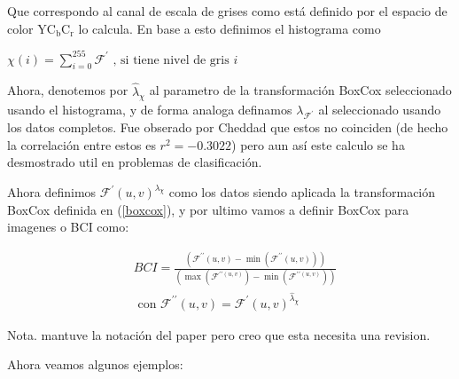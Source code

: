     Que correspondo al canal de escala de grises como est\'a definido por el espacio de color $\mathrm{YC}_{\mathrm{b}} \mathrm{C}_{\mathrm{r}}$ lo calcula. En base a esto definimos el histograma como
    
    $\chi(i)=\sum_{i=0}^{255}\mathcal{F}^{\prime} \text{ , si tiene nivel de gris } i$ 
    
    Ahora, denotemos por $\hat{\lambda}_{\chi}$ al parametro de la transformaci\'on BoxCox seleccionado usando el histograma, y de forma analoga definamos $\lambda_{\mathcal{F}^{\prime}}$ al seleccionado usando los datos completos. Fue obserado por Cheddad que estos no coinciden (de hecho la correlaci\'on entre estos es $r^2=-0.3022$) pero aun as\'i este calculo se ha desmostrado util en problemas de clasificaci\'on.


    Ahora definimos $\mathcal{F}^{\prime}(u, v)^{\lambda_{\chi}}$ como los datos siendo aplicada la transformaci\'on BoxCox definida en (\ref{boxcox}), y por ultimo vamos a definir BoxCox para imagenes o BCI como:

    $$    
    \begin{aligned}
        &B C I=\frac{\left(\mathcal{F}^{\prime \prime}(u, v)-\min \left(\mathcal{F}^{\prime \prime}(u, v)\right)\right)}{\left(\max \left(\mathcal{F}^{\prime \prime(u, v)}\right)-\min \left(\mathcal{F}^{\prime \prime(u, v)}\right)\right)}\\
        &\text { con } \mathcal{F}^{\prime \prime}(u, v)=\mathcal{F}^{\prime}(u, v)^{\hat{\lambda}_{\chi}}
    \end{aligned}
    $$
    
    Nota. mantuve la notaci\'on del paper pero creo que esta necesita una revision.


    Ahora veamos algunos ejemplos: